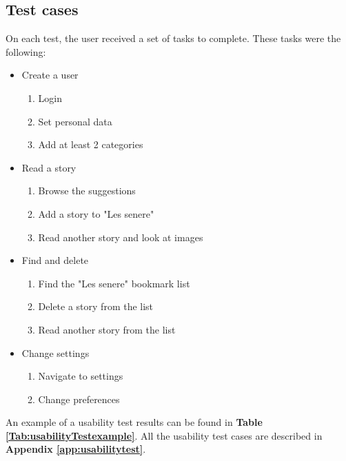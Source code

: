 \subsection{Test cases}

On each test, the user received a set of tasks to complete. These tasks were the following:

\begin{itemize}
	\item Create a user 	
	\begin{enumerate}
		\item Login 
		\item Set personal data 
		\item Add at least 2 categories 
	\end{enumerate}
	\item Read a story 
	\begin{enumerate}
		\item Browse the suggestions 
		\item Add a story to "Les senere" 
		\item Read another story and look at images 
	\end{enumerate}
	\item Find and delete 
	\begin{enumerate}
		\item Find the "Les senere" bookmark list
		\item Delete a story from the list
		\item Read another story from the list 
	\end{enumerate}
	\item Change settings 
	\begin{enumerate}
		\item Navigate to settings 
		\item Change preferences 
	\end{enumerate}
	
\end{itemize}

An example of a usability test results can be found in \textbf{Table \ref{Tab:usabilityTestexample}}. All the usability test cases are described in \textbf{Appendix \ref{app:usabilitytest}}.

